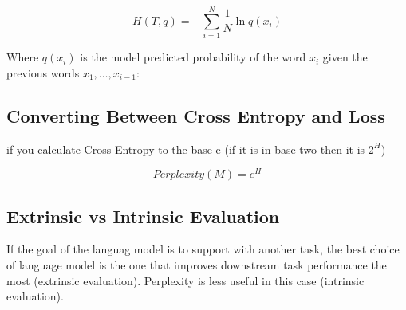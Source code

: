 \documentclass[11pt]{article}
\begin{document}
    
\begin{definition}
    \begin{equation*}
        H(T,q) = - \sum^N_{i=1} \frac 1 N \ln q(x_i)    
    \end{equation*}

    Where $q(x_i)$ is the model predicted probability of the word $x_i$ given the previous words $x_1, \ldots, x_{i-1}$:
\end{definition}

\subsection{Converting Between Cross Entropy and Loss}

if you calculate Cross Entropy to the base e (if it is in base two then it is $2^H$)

\begin{equation*}
    Perplexity(M) = e^H 
\end{equation*}

\subsection{Extrinsic vs Intrinsic Evaluation}

If the goal of the languag model is to support with another task, the best choice of language model is the one that improves downstream task performance the most (extrinsic evaluation). Perplexity is less useful in this case (intrinsic evaluation).

\printbibliography
{}
\end{document}
